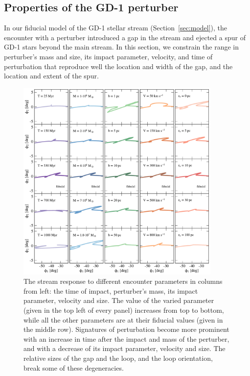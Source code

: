 \documentclass[twocolumn]{aastex62}
\begin{document}
\subsection{Properties of the GD-1 perturber}
\label{sec:perturber_properties}
In our fiducial model of the GD-1 stellar stream (Section~\ref{sec:model}), the encounter with a perturber introduced a gap in the stream and ejected a spur of GD-1 stars beyond the main stream.
In this section, we constrain the range in perturber's mass and size, its impact parameter, velocity, and time of perturbation that reproduce well the location and width of the gap, and the location and extent of the spur.

\begin{figure}
\begin{center}
\includegraphics[width=0.9\textwidth]{excursions.pdf}
\end{center}
\caption{The stream response to different encounter parameters in columns from left: the time of impact, perturber's mass, its impact parameter, velocity and size.
The value of the varied parameter (given in the top left of every panel) increases from top to bottom, while all the other parameters are at their fiducial values (given in the middle row).
Signatures of perturbation become more prominent with an increase in time after the impact and mass of the perturber, and with a decrease of its impact parameter, velocity and size.
The relative sizes of the gap and the loop, and the loop orientation, break some of these degeneracies.
}
\label{fig:scalings}
\end{figure}
\end{document}
